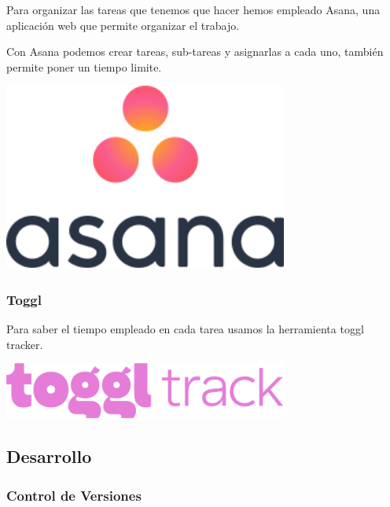 \documentclass[12pt,a4paper]{article}
\begin{document}
\begin{minipage}{.75\textwidth}
Para organizar las tareas que tenemos que hacer hemos empleado Asana, una aplicación web que permite organizar el trabajo.


Con Asana podemos crear tareas, sub-tareas y asignarlas a cada uno, también permite poner un tiempo limite. 
\end{minipage} %
\begin{minipage}{.25\textwidth}
  \includegraphics[width=0.7\textwidth, right]{asana}
\end{minipage}


\subsubsection{Toggl}

\begin{minipage}{.75\textwidth}
Para saber el tiempo empleado en cada tarea usamos la herramienta toggl tracker.
\end{minipage} %
\begin{minipage}{.25\textwidth}
  \includegraphics[width=0.7\textwidth, right]{toggl}
\end{minipage}

\subsection{Desarrollo}

\subsubsection{Control de Versiones}
\end{document}
